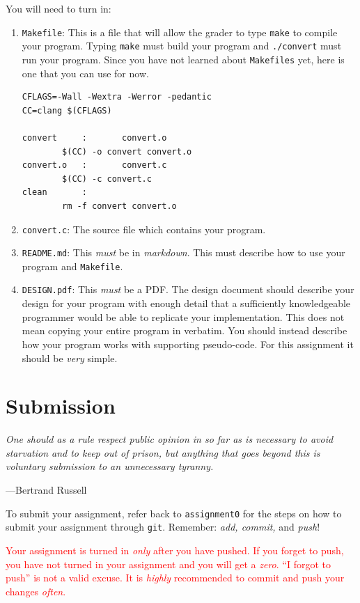 \documentclass{article}
\begin{document}
You will need to turn in:

\begin{enumerate}
\item \texttt{Makefile}: This is a file that will allow the grader
to type \texttt{make} to compile your program. Typing \texttt{make} must build your program and
\texttt{./convert} must run your program. Since you have not learned
about \texttt{Makefiles} yet, here is one that you can use for now.

\begin{lstlisting}
CFLAGS=-Wall -Wextra -Werror -pedantic
CC=clang $(CFLAGS)

convert     :       convert.o
        $(CC) -o convert convert.o
convert.o   :       convert.c
        $(CC) -c convert.c
clean   	:
        rm -f convert convert.o
\end{lstlisting}

\item \texttt{convert.c}: The source file which contains your program.

\item \texttt{README.md}: This \emph{must} be in \emph{markdown}.
This must describe how to use your program and \texttt{Makefile}.

\item \texttt{DESIGN.pdf}: This \emph{must} be a PDF. The design document
should describe your design for your program with enough detail
that a sufficiently knowledgeable programmer would be able to
replicate your implementation. This does not mean copying your
entire program in verbatim. You should instead describe how your
program works with supporting pseudo-code. For this assignment it should be \emph{very} simple.

\end{enumerate}


\section{Submission}
\epigraph{\emph{One should as a rule respect public opinion in so far as is
necessary to avoid starvation and to keep out of prison, but anything that
goes beyond this is voluntary submission to an unnecessary
tyranny.}}{---Bertrand Russell}\noindent

To submit your assignment, refer back to \texttt{assignment0} for
the steps on how to submit your assignment through \texttt{git}.
Remember: \emph{add, commit,} and \emph{push}!

\textcolor{red}{Your assignment is turned in \emph{only} after you have pushed.
If you forget to push, you have not turned in your assignment and you will get
a \emph{zero}. ``I forgot to push'' is not a valid excuse. It is \emph{highly} recommended to commit and push your changes \emph{often}.}
\end{document}
